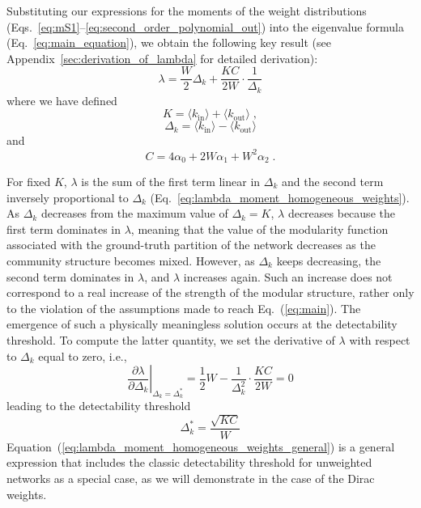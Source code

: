 \documentclass[a4paper,pre,superscriptaddress,floatfix,nofootinbib,twocolumn]{revtex4-1}
\begin{document}
Substituting our expressions for the moments of the weight distributions (Eqs.~\eqref{eq:mS1}--\eqref{eq:second_order_polynomial_out}) into the eigenvalue formula
(Eq.~\eqref{eq:main_equation}),
we obtain the following key result (see Appendix~\ref{sec:derivation_of_lambda} for detailed derivation):
\begin{equation}
    \lambda = \frac{W}{2}\Delta_{k} + \frac{KC}{2W}\cdot\frac{1}{\Delta_{k}}
\label{eq:lambda_moment_homogeneous_weights}
\end{equation}
where we have defined
\begin{equation}
K = \langle k_{\text{in}} \rangle + \langle k_{\text{out}} \rangle \; ,
\label{eq:kappa}
\end{equation}
\begin{equation}
\Delta_{k} = \langle k_{\text{in}} \rangle - \langle k_{\text{out}} \rangle
\label{eq:delta}
\end{equation}
and
\begin{equation}
    C =  4\alpha_0  + 2W\alpha_1 + W^2\alpha_2 \; .
    \label{eq:c_value}
\end{equation}

For fixed $K$, $\lambda$ is the sum of the first term linear in $\Delta_k$ and the second term inversely proportional to $\Delta_k$ (Eq.~\eqref{eq:lambda_moment_homogeneous_weights}). As $\Delta_k$ decreases from the maximum value of $\Delta_k=K$, $\lambda$ decreases because the first term dominates in $\lambda$, meaning that the value of the modularity function associated with the ground-truth partition of the network decreases as the community structure becomes mixed.
However, as $\Delta_k$ keeps decreasing, the second term dominates in $\lambda$, and $\lambda$ increases again. Such an increase does not correspond to a real increase of the strength of the modular structure, rather only to the violation of the assumptions made to reach Eq.~(\ref{eq:main}). The emergence of such a physically meaningless solution occurs at the detectability threshold. To compute the latter quantity, we set the derivative of $\lambda$ with respect to $\Delta_k$ equal to zero, i.e.,
\begin{equation}
    \left. \frac{\partial \lambda}{\partial \Delta_k} \right|_{\Delta_k = \Delta_k^*} =
    \frac{1}{2}W - \frac{1}{\Delta_{k}^2} \cdot \frac{KC}{2W}
    = 0
\end{equation}
leading to the detectability threshold
\begin{equation}
\Delta_k^* = \frac{\sqrt{K C}}{W}
\label{eq:lambda_moment_homogeneous_weights_general}
\end{equation}
Equation~(\ref{eq:lambda_moment_homogeneous_weights_general}) is a general expression that includes the classic detectability threshold for unweighted networks as a special case, as we will demonstrate in the case of the Dirac weights.
\end{document}
